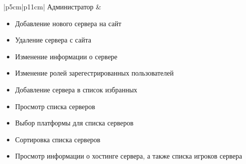 \begin{table}[H]
\begin{tabular}{|p{5cm}|p{11cm}|}
        Администратор &
            \begin{minipage}[t]{\linewidth}
                \begin{itemize}[nosep,after=\strut]
                    \item Добавление нового сервера на сайт
                    \item Удаление сервера с сайта
                    \item Изменение информации о сервере
                    \item Изменение ролей зарегестрированных пользователей
                    \item Добавление сервера в список избранных
                    \item Просмотр списка серверов
                    \item Выбор платформы для списка серверов
                    \item Сортировка списка серверов
                    \item Просмотр информации о хостинге сервера, а также списка игроков сервера
                \end{itemize}
            \end{minipage} 
        \\ \hline
    \end{tabular}
\end{table}



